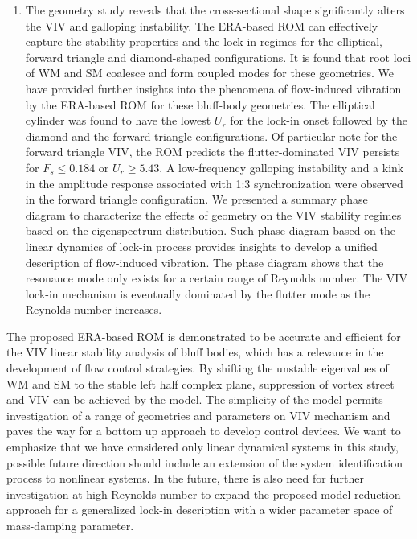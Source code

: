 \documentclass{jfm}
\begin{document}
\begin{enumerate}
\item{
The geometry study reveals that the cross-sectional shape significantly alters the VIV and galloping instability.  
The ERA-based ROM can effectively capture the stability properties and the lock-in regimes 
for the elliptical, forward triangle and diamond-shaped configurations.
It is found that root loci of WM and SM coalesce and form coupled modes for these geometries. 
We have provided further 
insights into the phenomena of flow-induced vibration by the ERA-based ROM for these bluff-body geometries.
The elliptical cylinder was found to have the lowest $U_r$ for the lock-in onset 
followed by the diamond and the forward triangle configurations.
Of particular note for the forward triangle VIV, 
the ROM predicts the flutter-dominated VIV persists for $F_s \le 0.184$ or $U_r \ge 5.43$. 
A low-frequency galloping instability and a kink in the amplitude response associated
with 1:3 synchronization were observed  in the forward triangle configuration.
We presented a summary phase diagram to characterize the effects of geometry
on the VIV stability regimes based on the eigenspectrum distribution.  Such phase diagram based 
on the linear dynamics of lock-in process provides insights to develop a unified description of flow-induced vibration.
The phase diagram shows that the resonance mode only exists for a certain range of Reynolds number. 
The VIV lock-in mechanism is eventually dominated by the flutter mode as the Reynolds number increases. 
}
\end{enumerate}

The proposed ERA-based ROM is demonstrated to be accurate and efficient for 
the VIV linear stability analysis of bluff bodies, 
which has a relevance in the development of flow control strategies.
By shifting the unstable eigenvalues of WM and SM 
to the stable left half complex plane, suppression of vortex street and VIV 
can be achieved by the model. The simplicity of the model permits investigation of a range of geometries 
and parameters on VIV mechanism and paves the way for a bottom up approach to develop 
control devices.
%
We want to emphasize that we have considered only linear dynamical systems in this study, 
possible future direction should include an extension of the system identification process
to nonlinear systems.
%
In the future, there is also need for further investigation at high Reynolds number
to expand the proposed model reduction approach for a generalized lock-in description 
with a wider parameter space of mass-damping parameter.
\end{document}
